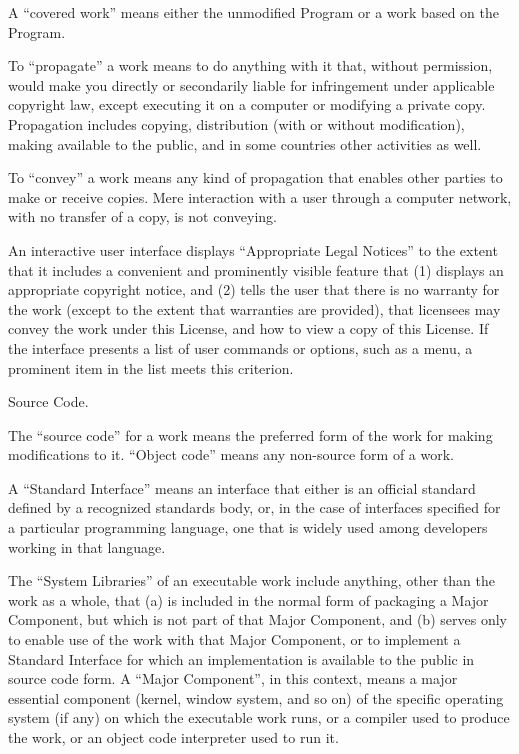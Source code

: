 A ``covered work'' means either the unmodified Program or a work based on the Program.

To ``propagate'' a work means to do anything with it that, without permission, would make you directly or secondarily liable for infringement under applicable copyright law, except executing it on a computer or modifying a private copy.  Propagation includes copying, distribution (with or without modification), making available to the public, and in some countries other activities as well.

To ``convey'' a work means any kind of propagation that enables other parties to make or receive copies.  Mere interaction with a user through a computer network, with no transfer of a copy, is not conveying.

An interactive user interface displays ``Appropriate Legal Notices'' to the extent that it includes a convenient and prominently visible feature that (1) displays an appropriate copyright notice, and (2) tells the user that there is no warranty for the work (except to the extent that warranties are provided), that licensees may convey the work under this License, and how to view a copy of this License.  If the interface presents a list of user commands or options, such as a menu, a prominent item in the list meets this criterion.

\item Source Code.

The ``source code'' for a work means the preferred form of the work for making modifications to it.  ``Object code'' means any non-source form of a work.

A ``Standard Interface'' means an interface that either is an official standard defined by a recognized standards body, or, in the case of interfaces specified for a particular programming language, one that is widely used among developers working in that language.

The ``System Libraries'' of an executable work include anything, other than the work as a whole, that (a) is included in the normal form of packaging a Major Component, but which is not part of that Major Component, and (b) serves only to enable use of the work with that Major Component, or to implement a Standard Interface for which an implementation is available to the public in source code form.  A ``Major Component'', in this context, means a major essential component (kernel, window system, and so on) of the specific operating system (if any) on which the executable work runs, or a compiler used to produce the work, or an object code interpreter used to run it.

